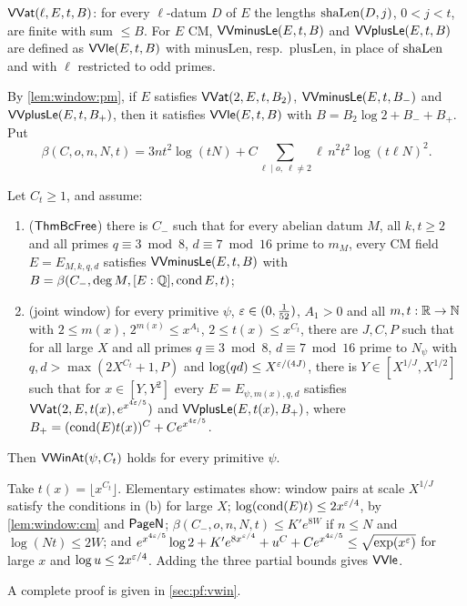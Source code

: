 \begin{definition}\label{def:window:partial}
$\mathsf{VVat}(\ell,E,t,B)$: for every $\ell$-datum $D$ of $E$ the lengths $\mathrm{shaLen}(D,j)$, $0<j<t$, are finite
with sum $\le B$. For $E$ CM, $\mathsf{VVminusLe}(E,t,B)$ and $\mathsf{VVplusLe}(E,t,B)$ are defined as
$\mathsf{VVle}(E,t,B)$ with $\mathrm{minusLen}$, resp.\ $\mathrm{plusLen}$, in place of $\mathrm{shaLen}$ and with $\ell$
restricted to odd primes.
\end{definition}

By \cref{lem:window:pm}, if $E$ satisfies $\mathsf{VVat}(2,E,t,B_2)$, $\mathsf{VVminusLe}(E,t,B_-)$ and
$\mathsf{VVplusLe}(E,t,B_+)$, then it satisfies $\mathsf{VVle}(E,t,B)$ with $B=B_2\log2+B_-+B_+$. Put
\[
 \beta(C,o,n,N,t)=3nt^2\log(tN)+C\sum_{\ell\mid o,\ \ell\ne2}\ell\,n^2t^2\log(t\ell N)^2 .
\]

\begin{proposition}\Fmark\label{prop:window:assembly}
Let $C_t\ge1$, and assume:
\begin{enumerate}[label=(\alph*)]
\item ($\mathsf{ThmBcFree}$) there is $C_-$ such that for every abelian datum $M$, all $k,t\ge2$ and all primes
  $q\equiv3\bmod8$, $d\equiv7\bmod16$ prime to $m_M$, every CM field $E=E_{M,k,q,d}$ satisfies
  $\mathsf{VVminusLe}(E,t,B)$ with $B=\beta(C_-,\deg M,[E:\mathbb{Q}],\operatorname{cond} E,t)$;
\item (joint window) for every primitive $\psi$, $\varepsilon\in(0,\frac1{52})$, $A_1>0$ and all $m,t:\mathbb{R}\to\mathbb{N}$ with
  $2\le m(x)$, $2^{m(x)}\le x^{A_1}$, $2\le t(x)\le x^{C_t}$, there are $J,C,P$ such that for all large $X$ and all
  primes $q\equiv3\bmod8$, $d\equiv7\bmod16$ prime to $N_\psi$ with $q,d>\max(2X^{C_t}+1,P)$ and
  $\log(qd)\le X^{\varepsilon/(4J)}$, there is $Y\in[X^{1/J},X^{1/2}]$ such that for $x\in[Y,Y^2]$ every
  $E=E_{\psi,m(x),q,d}$ satisfies $\mathsf{VVat}(2,E,t(x),e^{x^{4\varepsilon/5}})$ and $\mathsf{VVplusLe}(E,t(x),B_+)$,
  where $B_+=(\operatorname{cond}(E)t(x))^C+Ce^{x^{4\varepsilon/5}}$.
\end{enumerate}
Then $\mathsf{VWinAt}(\psi,C_t)$ holds for every primitive $\psi$.
\end{proposition}

\begin{proofoutline}
Take $t(x)=\lfloor x^{C_t}\rfloor$. Elementary estimates show: window pairs at scale $X^{1/J}$ satisfy the
conditions in (b) for large $X$; $\log(\operatorname{cond}(E)t)\le2x^{\varepsilon/4}$, by \cref{lem:window:cm} and $\mathsf{PageN}$;
$\beta(C_-,o,n,N,t)\le K'e^{8W}$ if $n\le N$ and $\log(Nt)\le2W$; and
$e^{x^{4\varepsilon/5}}\log2+K'e^{8x^{\varepsilon/4}}+u^C+Ce^{x^{4\varepsilon/5}}\le\sqrt{\exp(x^{\varepsilon})}$ for large $x$ and
$\log u\le2x^{\varepsilon/4}$. Adding the three partial bounds gives $\mathsf{VVle}$.

A complete proof is given in \cref{sec:pf:vwin}.
\end{proofoutline}


